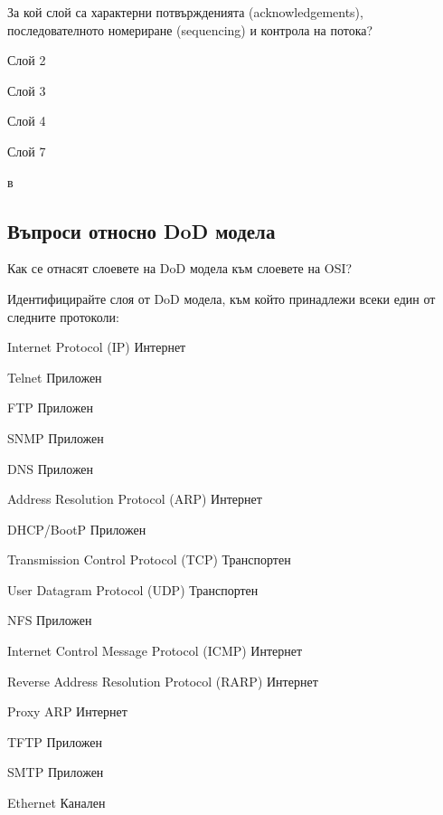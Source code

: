 \begin{q}
  За кой слой са характерни потвържденията (acknowledgements), последователното
  номериране (sequencing) и контрола на потока?

  \begin{defractors}
  \item Слой 2
  \item Слой 3
  \item Слой 4
  \item Слой 7
  \end{defractors}

  \rans в
\end{q}

\subsection{Въпроси относно DoD модела}
\begin{q}
  Как се отнасят слоевете на DoD модела към слоевете на OSI?
\end{q}

\begin{q}
  Идентифицирайте слоя от DoD модела, към който принадлежи всеки един от
  следните протоколи:

  \begin{itemize*}
  \item Internet Protocol (IP) \rans Интернет
  \item Telnet \rans Приложен
  \item FTP \rans Приложен
  \item SNMP \rans Приложен
  \item DNS \rans Приложен
  \item Address Resolution Protocol (ARP) \rans Интернет
  \item DHCP/BootP \rans Приложен
  \item Transmission Control Protocol (TCP) \rans Транспортен
  \item User Datagram Protocol (UDP) \rans Транспортен
  \item NFS \rans Приложен
  \item Internet Control Message Protocol (ICMP) \rans Интернет
  \item Reverse Address Resolution Protocol (RARP) \rans Интернет
  \item Proxy ARP \rans Интернет
  \item TFTP \rans Приложен
  \item SMTP \rans Приложен
  \item Ethernet \rans Канален
  \end{itemize*}
\end{q}

